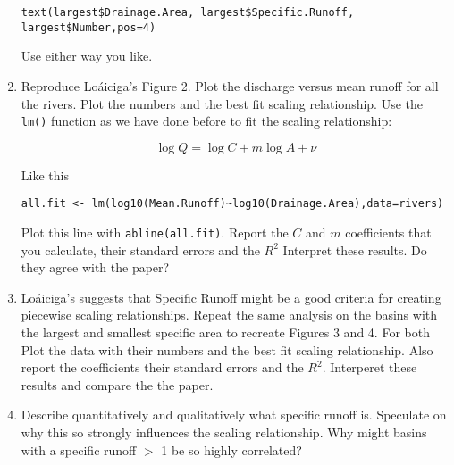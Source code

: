 \documentclass[11pt]{article}
\begin{document}
\begin{enumerate}
\begin{verbatim}
text(largest$Drainage.Area, largest$Specific.Runoff, largest$Number,pos=4)
\end{verbatim}

Use either way you like. 

\item Reproduce Lo\'aiciga's Figure 2.  Plot the discharge versus mean runoff for all the rivers. Plot the numbers and the best fit scaling relationship.  Use the \texttt{lm()} function as we have done before to fit the scaling relationship:

$$\log Q=\log C+m\log A+\nu$$

Like this

\begin{verbatim}
all.fit <- lm(log10(Mean.Runoff)~log10(Drainage.Area),data=rivers)
\end{verbatim}

Plot this line with \texttt{abline(all.fit)}.  Report the $C$ and $m$ coefficients that you calculate, their standard errors and the $R^2$  Interpret these results. Do they agree with the paper?

\item Lo\'aiciga's suggests that Specific Runoff might be a good criteria for creating piecewise scaling relationships.  Repeat the same analysis on the basins with the largest and smallest specific area to recreate Figures 3 and 4. For both Plot the data with their numbers and the best fit scaling relationship. Also report the coefficients their standard errors and the $R^2$.  Interperet these results and compare the the paper. 

\item Describe quantitatively and qualitatively what specific runoff is. Speculate on why this so strongly influences the scaling relationship. Why might basins with a specific runoff $>$ 1 be so highly correlated?

\end{enumerate}
\end{document}
